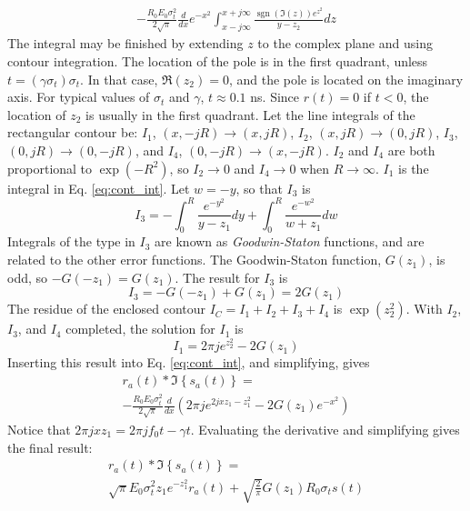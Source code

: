 \documentclass[amsmath,amssymb,aps,prd,10pt,twocolumn,showkeys]{revtex4}
\DeclareMathOperator{\sgn}{sgn}
\begin{document}
\begin{itemize}
\begin{multline}
-\frac{R_0E_0\sigma_t^2}{2\sqrt{\pi}}\frac{d}{dx}e^{-x^2} \int_{x-j\infty}^{x+j\infty} \frac{\sgn(\Im(z)) e^{z^2}}{y-z_2}dz \label{eq:cont_int}
\end{multline}
The integral may be finished by extending $z$ to the complex plane and using contour integration.  The location of the pole is in the first quadrant, unless $t = (\gamma \sigma_t)\sigma_t$.  In that case, $\Re(z_2)=0$, and the pole is located on the imaginary axis.  For typical values of $\sigma_t$ and $\gamma$, $t\approx 0.1$ ns. Since $r(t)=0$ if $t<0$, the location of $z_2$ is usually in the first quadrant.  Let the line integrals of the rectangular contour be: $I_1$, $(x,-jR) \to (x,jR)$, $I_2$, $(x,jR) \to (0,jR)$, $I_3$, $(0,jR) \to (0,-jR)$, and $I_4$, $(0,-jR) \to (x,-jR)$.  $I_2$ and $I_4$ are both proportional to $\exp(-R^2)$, so $I_2 \to 0$ and $I_4 \to 0$ when $R \to \infty$.  $I_1$ is the integral in Eq. \ref{eq:cont_int}.  Let $w = -y$, so that $I_3$ is
\begin{equation}
I_3 = -\int_0^{R} \frac{e^{-y^2}}{y-z_1} dy + \int_0^{R} \frac{e^{-w^2}}{w+z_1} dw
\end{equation}
Integrals of the type in $I_3$ are known as \textit{Goodwin-Staton} functions, and are related to the other error functions.  The Goodwin-Staton function, $G(z_1)$, is odd, so $-G(-z_1) = G(z_1)$.  The result for $I_3$ is
\begin{equation}
I_3 = -G(-z_1) + G(z_1) = 2G(z_1)
\end{equation}
The residue of the enclosed contour $I_C = I_1+I_2+I_3+I_4$ is $\exp(z_2^2)$.  With $I_2$, $I_3$, and $I_4$ completed, the solution for $I_1$ is
\begin{equation}
I_1 = 2\pi j e^{z_2^2} - 2G(z_1)
\end{equation}
Inserting this result into Eq. \ref{eq:cont_int}, and simplifying, gives
\begin{multline}
r_a(t) * \Im\left\lbrace s_a(t) \right\rbrace = \\
-\frac{R_0E_0\sigma_t^2}{2\sqrt{\pi}}\frac{d}{dx}\left( 2\pi j e^{2 j x z_1 - z_1^2} - 2G(z_1) e^{-x^2} \right)
\end{multline}
Notice that $2\pi j x z_1 = 2\pi j f_0 t - \gamma t$.  Evaluating the derivative and simplifying gives the final result:
\begin{multline}
r_a(t) * \Im\left\lbrace s_a(t) \right\rbrace = \\
\sqrt{\pi}E_0 \sigma_t^2 z_1 e^{-z_1^2}r_a(t) + \sqrt{\frac{2}{\pi}} G(z_1) R_0 \sigma_t s(t) \label{eq:Im_result}

\end{multline}
\end{itemize}
\end{document}
